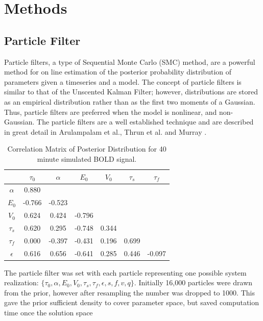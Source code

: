 \documentclass{article}
\begin{document}
\section{Methods}
\label{sec:Methods}
\subsection{Particle Filter}
\label{sec:ParticleFilter}
Particle filters, a type of Sequential Monte Carlo (SMC) method,
are a powerful method for on line estimation of the posterior probability 
distribution of parameters given a timeseries and a model. The concept of 
particle filters is similar to that of the Unscented Kalman Filter; however,
distributions are stored as an empirical distribution rather than 
as the first two moments of a Gaussian. Thus, particle filters are 
preferred when the model is nonlinear, and non-Gaussian. 
The particle filters are a well established technique and are 
described in great detail in Arulampalam et al., Thrun et al. 
and Murray \cite{Arulampalam2002a, thrun2008probabilistic, Murray2008}.
\begin{table}[t]
\ninept
  \centering
\begin{tabular}{|c | c  c  c  c  c  c  |}
\hline
  & $\tau_0$ & $\alpha$ & $E_0$    & $V_0$    & $\tau_s$ & $\tau_f$  \\
\hline
$\alpha$                      & 0.880& & & & & \\
\rowcolor[gray]{.8} $E_0$     & -0.766& -0.523& & & & \\
$V_0$                         & 0.624& 0.424& -0.796& & & \\
\rowcolor[gray]{.8} $\tau_s$  & 0.620& 0.295& -0.748& 0.344& & \\
$\tau_f$                      & 0.000& -0.397& -0.431& 0.196& 0.699& \\
\rowcolor[gray]{.8} $\epsilon$& 0.616& 0.656& -0.641& 0.285& 0.446& -0.097\\
\hline
\end{tabular}
  \caption{Correlation Matrix of Posterior Distribution for 40 minute simulated BOLD signal.}
\label{tab:long_corr}
\end{table}
The particle filter was set with each particle representing one possible 
system realization: $\{\tau_0, \alpha, E_0, V_0, \tau_s, \tau_f,
\epsilon, s, f, v, q\}$. Initially 16,000 particles were drawn
from the prior, however after resampling the number was dropped
to 1000. This gave the prior sufficient density to
cover parameter space, but saved computation time once the solution space
\end{document}
